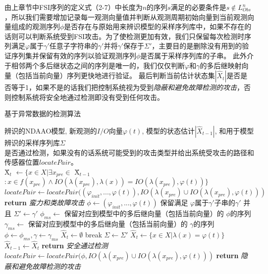由上章节中FSI序列的定义式（2-7）中长度为$n$的序列$s$满足的必要条件是$s\notin L_{Obs}^n$，所以我们需要增加记录每一观测向量值并判断从观测周期初始向量到当前观测向量组成的观测序列$\phi$是否存在与原始用来辨识模型的采样序列库中，如果不存在的话则可以判断系统受到FSI攻击。为了使检测更加有效，我们只保留每次检测时序列满足$ \varphi$属于$\gamma'$任意子字符串的$\gamma'$并将$\gamma'$保存于$\varSigma'$，主要目的是删除没有用到的验证序列集并保留有效的序列以验证观测序列$\phi$是否属于采样序列库的子串。 此外介于相邻两个多后继状态之间的序列是唯一的，我们仅仅判断$ \varphi $和$ \gamma $的多后继映射向量（包括当前向量）序列更快地进行验证。 最后判断当前估计状态集$|\hat{X}_{t}|$是否是否等于1，如果不是的话我们把控制系统视为受到\textit {隐蔽和避免故障检测的攻击}，否则控制系统将安全地通过检测即没有受到任何攻击。

\begin{algorithm}[h]
		\caption{基于异常数据的检测算法}
		\label{algo:abd}
		\begin{algorithmic}[1]
			\Require %
			辨识的NDAAO模型, 新观测的$I/O$向量$\varphi(t)$, 模型的状态估计$|\hat{X}_{t-1}|$, 和用于模型辨识的采样序列库$\varSigma$ \\  
			\Ensure %
			是否通过检测，如果没有的话系统可能受到的攻击类型并给出系统受攻击的路径和传感器位置$locatePair$。 \\
			\State \^{X}$_{t}$ $\leftarrow \{x\in X|\exists x_{pre}\in$ \^{X}$_{t-1}$$:x\in f(x_{pre}) \wedge IO(\lambda(x_{pre}),\lambda(x))=IO(\lambda(x_{pre}),\varphi(t))\}$
			\State $locatePair\leftarrow locatePair((\varphi_{init},...,\varphi(t)),IO(\lambda(x_{pre})\cup IO(\lambda(x_{pre}),\varphi(t)))$
			\State \textbf{return} \textit{蛮力和类故障攻击}
			\EndIf
			\State $\phi \leftarrow (\varphi_{init},...,\varphi(t))$
			\State 保留满足 $\varphi 属于\gamma'$子串的$\gamma'$ 并且 $\varSigma' \leftarrow \gamma'$
			\State $\phi_{ms} \leftarrow$ 保留对应到模型中的多后继向量（包括当前向量）的 $\phi$的序列
			\State $\gamma_{ms} \leftarrow$ 保留对应到模型中的多后继向量（包括当前向量）的 $\gamma$的序列
			\State $\phi\leftarrow \phi_{ms}, \gamma\leftarrow \gamma_{ms}$
			\State $\hat{X}_t \leftarrow \emptyset$
			\State break
			\EndIf
			\EndFor
			$\varSigma \leftarrow \varSigma'$
			\EndIf
			\Else
			\State $\hat{X}_t \leftarrow \{x\in X|\lambda(x)=\varphi(t)\}$
			\EndIf
			$\hat{X}_{t-1}\leftarrow \hat{X}_t$
			\State \textbf{return} \textit{安全通过检测}
			\Else
			\State $locatePair\leftarrow locatePair(\phi,IO(\lambda(x_{pre})\cup
			IO(\lambda(x_{pre}),\varphi(t)))$
			\State \textbf{return} \textit{隐蔽和避免故障检测的攻击}
			\EndIf
		\end{algorithmic}
	\end{algorithm}








